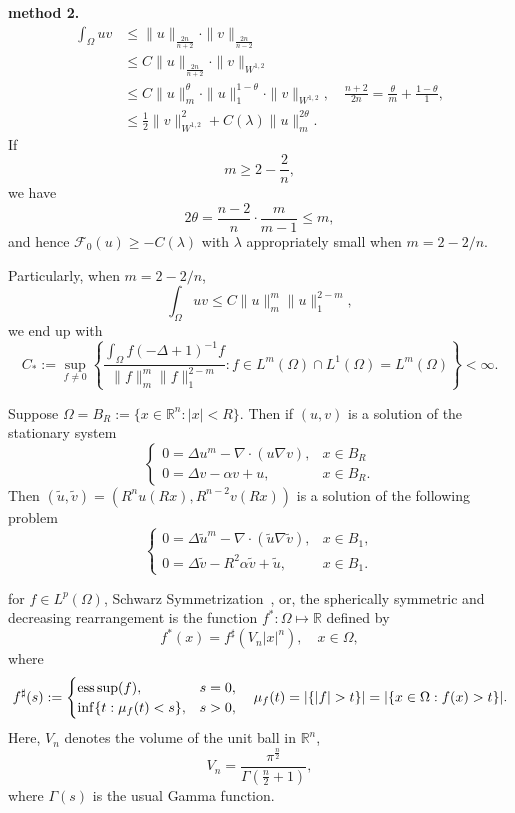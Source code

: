\textbf{method 2.}
\begin{align*}
	\int_\Omega uv &\leq \|u\|_{\frac{2n}{n+2}}\cdot\|v\|_{\frac{2n}{n-2}}\\
		&\leq C\|u\|_{\frac{2n}{n+2}}\cdot\|v\|_{W^{1,2}}\\
		&\leq C\|u\|_m^\theta\cdot\|u\|_1^{1-\theta}\cdot\|v\|_{W^{1,2}},
			\quad \frac{n+2}{2n} = \frac{\theta}{m} + \frac{1-\theta}{1},\\
		&\leq \frac{1}{2}\|v\|_{W^{1,2}}^2 + C(\lambda)\|u\|_m^{2\theta}.
\end{align*}
If 
	\[
		m\geq 2-\frac2n,
	\]
we have 
\[
	2\theta = \frac{n-2}{n}\cdot\frac{m}{m-1}\leq m,
\]
and hence $\mathcal{F}_0(u) \geq - C(\lambda)$ with $\lambda$ appropriately small 
when $m=2-2/n$. 

Particularly, when $m=2-2/n$,
\[
	\int_\Omega uv \leq C\|u\|_m^m \|u\|_1^{2-m},
\]
we end up with 
\begin{equation}
	C_\ast := \sup_{f\neq0}\left\{\frac{\int_\Omega f(-\Delta+1)^{-1}f}{\|f\|_m^m\|f\|_1^{2-m}}: f\in L^m(\Omega)\cap L^1(\Omega) = L^m(\Omega)\right\} < \infty.
\end{equation}

Suppose $\Omega = B_R := \{x\in\mathbb{R}^n: |x|<R\}$. 
Then if $(u,v)$ is a solution of the stationary system
\begin{equation}
	\begin{cases}
		0 = \Delta u^m - \nabla\cdot(u\nabla v), & x\in B_R\\
		0 = \Delta v - \alpha v + u, & x\in B_R.
	\end{cases}
\end{equation}
Then $(\tilde{u}, \tilde{v}) = (R^nu(Rx), R^{n-2}v(Rx))$ is a solution of the following problem
\begin{equation*}
	\begin{cases}
		0 = \Delta \tilde{u}^m - \nabla\cdot(\tilde u\nabla \tilde v), & x\in B_1,\\
		0 = \Delta \tilde v - R^2\alpha \tilde v + \tilde u, & x\in B_1.
	\end{cases}
\end{equation*}

for $f\in L^p(\Omega)$, Schwarz Symmetrization~\cite{Kesavan2006}, or, the spherically symmetric and decreasing rearrangement is the function $f^*: \Omega \mapsto \mathbb{R}$ defined by 
\[
	f^\ast(x) = f^\sharp (V_n |x|^n),\quad x\in\Omega,
\]
where
\begin{equation*}
	f^\sharp(s) := 
	\begin{cases}
		\esssup(f),& s=0,\\
		\inf\{t:\mu_f(t) <s\}, & s>0,
	\end{cases}
	\quad \mu_f(t) = |\{|f|>t\}| = |\{x\in\Omega: f(x)>t\}|.
\end{equation*}
Here, $V_n$ denotes the volume of the unit ball in $\mathbb{R}^n$,
\[
	V_n=\frac{\pi^{\frac{n}{2}}}{\Gamma\left(\frac{n}{2}+1\right)},
\]
where $\Gamma(s)$ is the usual Gamma function.

